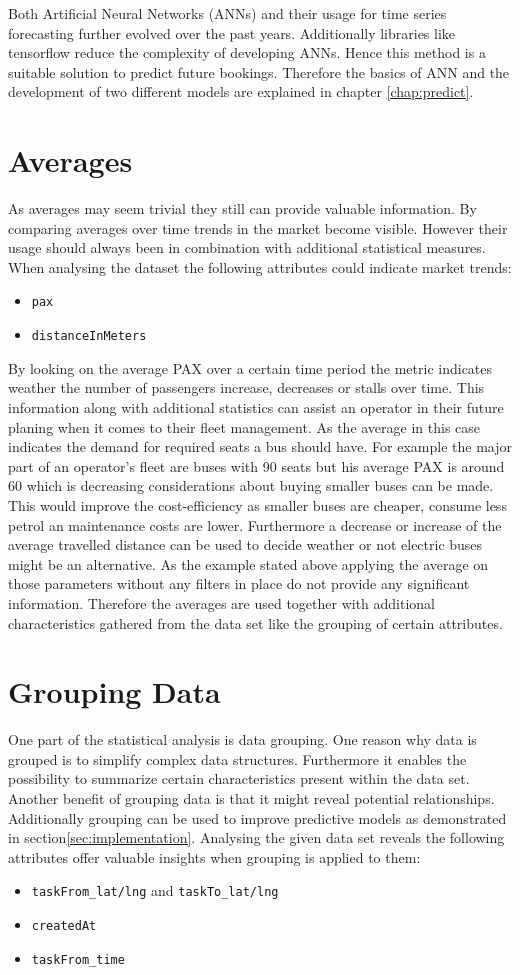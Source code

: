 Both Artificial Neural Networks (ANNs) and their usage for time series forecasting further evolved over the past years. Additionally libraries like tensorflow  reduce the complexity of developing ANNs. Hence this method is a suitable solution to predict future bookings. Therefore the basics of ANN and the development of two different models are explained in chapter \ref{chap:predict}.

\section{Averages}
As averages may seem trivial they still can provide valuable information. By comparing averages over time trends in the market become visible. However their usage should always been in combination with additional statistical measures. When analysing the dataset the following attributes could indicate market trends: 
\begin{itemize}
\item \verb|pax|
\item \verb|distanceInMeters|
\end{itemize}
By looking on the average PAX over a certain time period the metric indicates weather the number of passengers increase, decreases or stalls over time. This information along with additional statistics can assist an operator in their future planing when it comes to their fleet management. As the average in this case indicates the demand for required seats a bus should have. For example the major part of an operator's fleet are buses with 90 seats but his average PAX is around 60 which is decreasing considerations about buying smaller buses can be made. This would improve the cost-efficiency as smaller buses are cheaper, consume less petrol an maintenance costs are lower. Furthermore a decrease or increase of the average travelled distance can be used to decide weather or not electric buses might be an alternative.
As the example stated above applying the average on those parameters without any filters in place do not provide any significant information. Therefore the averages are used together with additional characteristics gathered from the data set like the grouping of certain attributes. 

\section{Grouping Data}
One part of the statistical analysis is data grouping. One reason why data is grouped is to simplify complex data structures. Furthermore it enables the possibility to summarize certain characteristics present within the data set. Another benefit of grouping data is that it might reveal potential relationships. Additionally grouping can be used to improve predictive models as demonstrated in section\ref{sec:implementation}.
Analysing the given data set reveals the following attributes offer valuable insights when grouping is applied to them: 
\begin{itemize}
\item \verb|taskFrom_lat/lng| and \verb|taskTo_lat/lng|
\item \verb|createdAt|
\item \verb|taskFrom_time|
\end{itemize}
